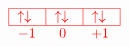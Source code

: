 \[
    \textcolor{red}{
        \begin{array}{c}
            \begin{tabular}{|m{0.5cm}|m{0.5cm}|m{0.5cm}|}
                \hline
                $\uparrow \downarrow$ & $\uparrow \downarrow$ & $\uparrow \downarrow$ \\
                \hline
            \end{tabular} \\ 
            \begin{tabular}{m{0.5cm} m{0.5cm} m{0.5cm}}
                $-1$ & \text{ 0 } & $+1$
            \end{tabular}
        \end{array}
    }
\]